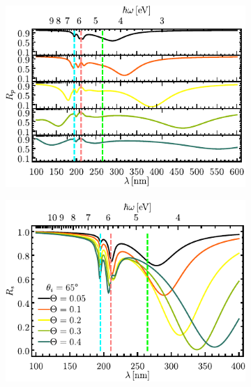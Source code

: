\begin{figure}[h!]\centering\hspace*{-1.5em}
	\begin{subfigure}{.01\linewidth}\caption{}\label{sfig:R-ATR10-cutp}\vspace{4.5cm}\end{subfigure}
	\begin{subfigure}{.45\linewidth}\hspace*{-1.5em}
	\includegraphics[scale=1]{2-Resultados/figs/2-Wp10ThetaVar/cut_angle_65_p_Stack.pdf}\end{subfigure}
	\begin{subfigure}{.01\linewidth}\caption{}\label{sfig:R-ATR10-cuts}\vspace{4.5cm}\end{subfigure}\hspace*{-1.em}
	\begin{subfigure}{.45\linewidth}\centering
	\includegraphics[scale=1 ]{2-Resultados/figs/2-Wp10ThetaVar/cut_angle_65_s.pdf}\end{subfigure}\vspace*{-.7em}

\end{figure}
